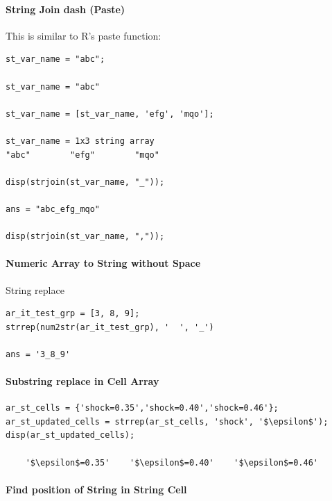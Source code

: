\documentclass[
]{book}
\begin{document}
\hypertarget{string-join-dash-paste}{%
\paragraph{String Join dash (Paste)}\label{string-join-dash-paste}}

This is similar to R's paste function:

\begin{verbatim}
st_var_name = "abc";

st_var_name = "abc"

st_var_name = [st_var_name, 'efg', 'mqo'];

st_var_name = 1x3 string array    
"abc"        "efg"        "mqo"        

disp(strjoin(st_var_name, "_"));

ans = "abc_efg_mqo"

disp(strjoin(st_var_name, ","));
\end{verbatim}

\hypertarget{numeric-array-to-string-without-space}{%
\paragraph{Numeric Array to String without Space}\label{numeric-array-to-string-without-space}}

String replace

\begin{verbatim}
ar_it_test_grp = [3, 8, 9];
strrep(num2str(ar_it_test_grp), '  ', '_')

ans = '3_8_9'
\end{verbatim}

\hypertarget{substring-replace-in-cell-array}{%
\paragraph{Substring replace in Cell Array}\label{substring-replace-in-cell-array}}

\begin{verbatim}
ar_st_cells = {'shock=0.35','shock=0.40','shock=0.46'};
ar_st_updated_cells = strrep(ar_st_cells, 'shock', '$\epsilon$');
disp(ar_st_updated_cells);

    '$\epsilon$=0.35'    '$\epsilon$=0.40'    '$\epsilon$=0.46'
\end{verbatim}

\hypertarget{find-position-of-string-in-string-cell}{%
\paragraph{Find position of String in String Cell}\label{find-position-of-string-in-string-cell}}
\end{document}
